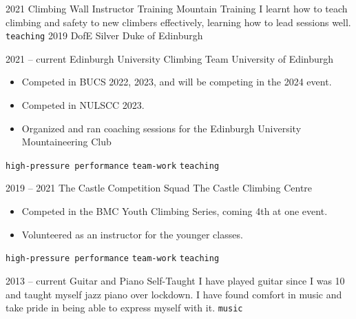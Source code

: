 \documentclass[9pt]{developercv} %
\begin{document}
\vspace{-10 pt}
\begin{entrylist}
	\entry
        {2021}
		{Climbing Wall Instructor Training}
		{Mountain Training}
		{ 
			I learnt how to teach climbing and safety to new climbers effectively, learning how to lead sessions well. 
			\newline
        	\texttt{teaching}
		}
	\entry
        {2019}
		{DofE Silver}
		{Duke of Edinburgh}
		{ 
		}
\end{entrylist}


\vspace{-10 pt}
\begin{entrylist}
	\entry
        {2021 -- current}
		{Edinburgh University Climbing Team}
		{University of Edinburgh}
		{\vspace{-10pt}
        \begin{itemize}[noitemsep,topsep=0pt,parsep=0pt,partopsep=0pt, leftmargin=-1pt]
            \item Competed in BUCS 2022, 2023, and will be competing in the 2024 event. 
            \item Competed in NULSCC 2023. 
            \item Organized and ran coaching sessions for the Edinburgh University Mountaineering Club
        \end{itemize} 
        \texttt{high-pressure performance} \slashsep \texttt{team-work} \slashsep \texttt{teaching}}
	\entry
		{2019 -- 2021}
		{The Castle Competition Squad}
		{The Castle Climbing Centre}
		{\vspace{-10pt}
        \begin{itemize}[noitemsep,topsep=0pt,parsep=0pt,partopsep=0pt, leftmargin=-1pt]
            \item Competed in the BMC Youth Climbing Series, coming 4th at one event.
            \item Volunteered as an instructor for the younger classes. 
        \end{itemize} 
        \texttt{high-pressure performance} \slashsep \texttt{team-work} \slashsep \texttt{teaching}}
	\entry
		{2013 -- current}
		{Guitar and Piano}
		{Self-Taught}
		{
			I have played guitar since I was 10 and taught myself jazz piano over lockdown. 
			I have found comfort in music and take pride in being able to express myself with it. 
        \newline
		\texttt{music}
		}
\end{entrylist}
\end{document}
